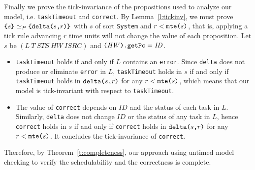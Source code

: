 \documentclass[10pt,journal]{IEEEtran}
\newcommand{\hide}[1]{\ignorespaces}
\begin{document}
{\begin{IEEEproof}
Finally we prove the tick-invariance of the propositions used to
analyze our model, i.e. \verb|taskTimeout| and \verb|correct|. By
Lemma~\ref{l:tickinv}, we must prove
$\verb|{|s\verb|}|\simeq_P\verb|{|\deltaS{s}{r}\verb|}|$ with $s$ of
sort \verb|System| and $r<\mteS{s}$, that is, applying a tick rule
advancing $r$ time units will not change the value of each
proposition. Let $s$ be
$(\mathit{L}~\mathit{T}~\mathit{STS}~\mathit{HW}~\mathit{ISRC})$ and
$\verb|(|\mathit{HW}\verb|).getPc|=\mathit{ID}$.
\begin{itemize}
\item \verb|taskTimeout| holds if and only if $L$ contains an
  \verb|error|. Since \verb|delta| does not produce or eliminate
  \verb|error| in $L$, \verb|taskTimeout| holds in $s$ if and only if
  \verb|taskTimeout| holds in $\deltaS{s}{r}$ for any $r<\mteS{s}$,
  which means that our model is tick-invariant with respect to
  \verb|taskTimeout|.
\hide{ 
In our model, an \verb|error| cannot be eliminated by any operations,
hence, if \verb|taskTimeout| holds in $s$, it must hold in
$\deltaS{s}{r}$. On the other hand, \verb|error| can pop up only when
operation \verb|update_with_| is applied, i.e., only when the
instantaneous rule \verb|interrupt-handle| applies. If
\verb|taskTimeout| does not hold in $s$, it will not hold either in
$\deltaS{s}{r}$ for any $r<\mteS{s}$, since instantaneous rules cannot
apply in $\deltaS{s}{r'}$ for any $r'<\mteS{s}$ by time-robustness.}
\item The value of \verb|correct| depends on $ID$ and the status of
  each task in $L$. Similarly, \verb|delta| does not change $ID$ or
  the status of any task in $L$, hence \verb|correct| holds in $s$ if
  and only if \verb|correct| holds in $\deltaS{s}{r}$ for any
  $r<\mteS{s}$. It concludes the tick-invariance of \verb|correct|.
\end{itemize}

Therefore, by Theorem~\ref{t:completeness}, our approach using untimed
model checking to verify the schedulability and the correctness is
complete.
\end{IEEEproof}


\hide{
\ifCLASSOPTIONcompsoc
  \section*{Acknowledgments}
\else
  \section*{Acknowledgment}
\fi

}}
\end{document}
